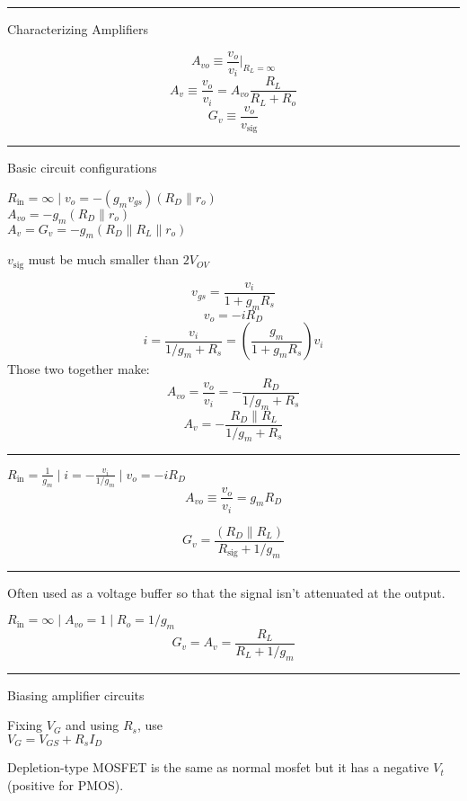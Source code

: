 \documentclass[a4paper]{article}
\begin{document}
\begin{multicols*}{3}
\columnbreak

\hrule
\vspace{1mm}
Characterizing Amplifiers

$$A_{vo} \equiv \frac{v_o}{v_i} \Big|_{R_L=\infty}$$
$$A_v \equiv \frac{v_o}{v_i} = A_{vo} \frac{R_L}{R_L + R_o}$$
$$G_v \equiv \frac{v_o}{v_\text{sig}}$$
    
\hrule
\vspace{1mm}
Basic circuit configurations


$R_{\text{in}}=\infty \mid v_o=-(g_mv_{gs})(R_D \parallel r_o)$\\
$A_{vo}=-g_m(R_D \parallel r_o)$\\
$A_v = G_v =-g_m(R_D \parallel R_L \parallel r_o)$

$v_{\text{sig}}$ must be much smaller than $2V_{OV}$

$$v_{gs}=\frac{v_i}{1+g_mR_s}$$
$$v_o=-i R_D$$
$$i = \frac{v_i}{1/g_m + R_s} = \left(\frac{g_m}{1+g_m R_s}\right)v_i$$
Those two together make:
$$A_{vo}=\frac{v_o}{v_i} = -\frac{R_D}{1/g_m + R_s}$$
$$A_v=-\frac{R_D \parallel R_L}{1/g_m + R_s}$$

\hrule

$R_\text{in}=\frac{1}{g_m} \mid i=-\frac{v_i}{1/g_m} \mid v_o=-i R_D$\\
$$A_{vo} \equiv \frac{v_o}{v_i} = g_m R_D$$

$$G_v= \frac{(R_D \parallel R_L)}{R_\text{sig}+1/ g_m}$$

\hrule

Often used as a voltage buffer so that the signal isn't attenuated
at the output.

$R_\text{in}=\infty \mid A_{vo}=1 \mid R_o=1/g_m$
$$G_v=A_v=\frac{R_L}{R_L+1/g_m}$$

\hrule
\vspace{1mm}
Biasing amplifier circuits

Fixing $V_G$ and using $R_s$, use\\
$V_G=V_{GS}+R_sI_D$

\vspace{1cm}
Depletion-type MOSFET is the same as normal mosfet but 
it has a negative $V_t$ (positive for PMOS).
\end{multicols*}
\end{document}
